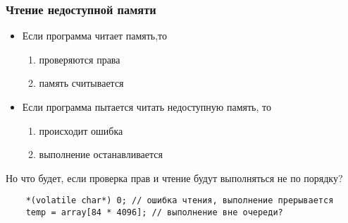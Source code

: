 \subsubsection{Чтение недоступной памяти}
\begin{frame}{\insertsubsubsection}

  \begin{itemize}
  \item Если программа читает память,то
    \begin{enumerate}
    \item проверяются права
    \item память считывается
    \end{enumerate}
  \item Если программа пытается читать недоступную память, то
    \begin{enumerate}
    \item происходит ошибка
    \item выполнение останавливается
    \end{enumerate}
  \end{itemize}

  Но что будет, если проверка прав и чтение будут выполняться не по порядку?

  \note{


  }
\end{frame}

\begin{frame}[fragile]{\insertsubsubsection}

  \begin{verbatim}
    *(volatile char*) 0; // ошибка чтения, выполнение прерывается
    temp = array[84 * 4096]; // выполнение вне очереди?
  \end{verbatim}



\end{frame}


